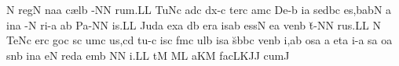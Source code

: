 \spatium
\custos N
\lineaproxima
\sgn reg\punctum N\egn
\sgn na{}\punctum a\egn
\spatium
\sgn c{\ae}l\punctum b\egn
\sgn {}{\o}-\punctum N\augmentum N\egn
\sgn ru{m.}\punctum L\augmentum L\egn
\spatium
\divisiofinalis
\spatium
\sgn Tu{}\pes Nc\egn
\spatium
\sgn {}ad\punctum c\egn
\spatium
\sgn d{\e}{x-}\punctum c\egn
\sgn ter\punctum c\egn
\sgn {}am\punctum c\egn
\spatium
\sgn De-\punctum b\egn
\sgn {}i{}\punctum a\egn
\spatium
\sgn sed\pes bc\egn
\sgn {}e{s,}\clivis ba\augmentumduplex bN\egn
\spatium
\divisiominor
\spatium
\custos a
\lineaproxima 
\sgn {}in\punctum a\egn
\spatium
{}-\punctum N\egn
\sgn ri-\punctum a\egn
\sgn {}a{}\punctum b\egn
\spatium
\sgn Pa-\punctum N\augmentum N\egn
{}i{s.}\punctum L\augmentum L\egn
\spatium
\divisiofinalis
\spatium
\sgn Jud\punctum a\egn
\sgn {}ex\punctum a\egn
\spatium
{}d\punctum b\egn
\sgn {}er\punctum a\egn
\sgn {}is\punctum a\augmentum b\egn
\spatium
\divisiominima
\spatium
\sgn {}e{ss}\punctum N\egn
\sgn {}e{}\punctum a\egn
\spatium
\sgn ven\punctum b\egn
\sgn t{\u}-\punctum N\augmentum N\egn
\sgn ru{s.}\punctum L\augmentum L\egn
\spatium
\divisiofinalis
\spatium
\custos N
\lineaproxima
\sgn Te{}\pes Nc\egn
\spatium
\sgn {}er\punctum c\egn
\sgn go{}\punctum c\egn
\spatium
{}s\punctum c\egn
\sgn {}um\punctum c\egn
\sgn {}u{s,}\punctum c\augmentum d\egn
\spatium
\sgn tu-\punctum c\egn
\sgn {}is\punctum c\egn
\spatium
\sgn f{\a}m\punctum c\egn
\sgn {}ul\punctum b\egn
\sgn {}is\punctum a\egn
\spatium
\sgn s{\u}b\pes bc\egn
\sgn ve{n}\punctum b\egn
\sgn {}i,\punctum a\augmentum b\egn
\spatium
\divisiominor
\spatium
{}os\punctum a\egn
\spatium
\custos a
\lineaproxima
{}et\engl{}\punctum a\egn
\sgn {}i-\punctum a\egn
\sgn {}{\o}s\punctum a\egn
\sgn {}o{}\punctum a\egn
\spatium
\sgn s{\a}n\punctum b\egn
{}in\punctum a\egn
\sgn {}e{}\punctum N\egn
\spatium
\sgn red\punctum a\egn
\sgn {}em\punctum b\egn
{}\punctum N\augmentum N\egn
\sgn {}i.\punctum L\augmentum L\egn
\spatium\divisiofinalis\spatium
\sgn {}{\AE}t\punctum M\egn
{}\clivis ML\egn
\sgn {}a{}\pes KM\egn
\spatium
\sgn fac\climacus LKJ\augmentum J\egn
\spatium
\divisiominor
\spatium
%
\sgn cum\punctum J\egn
